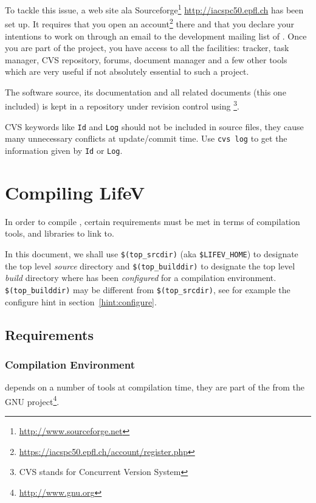 To tackle this issue, a web site ala Sourceforge\footnote{\url{http://www.sourceforge.net}} \url{http://iacspc50.epfl.ch} has been set up. It requires that you open an account\footnote{\url{https://iacspc50.epfl.ch/account/register.php}} there and that you declare your intentions to work on \lifev through an email to the development mailing list of \lifev. Once you are part of the project, you have access to all the facilities: tracker, task manager, CVS repository, forums, document manager and a few other tools which are very useful if not absolutely essential to such a project.


The software source, its documentation and all related documents (this
one included) is kept in a repository under revision control
using \footnote{CVS
  stands for Concurrent Version System}.

CVS keywords like \verb!Id! and \verb!Log! should not be included in source files,
they cause many unnecessary conflicts at update/commit time. Use 
\verb!cvs log! to get the information given by \verb!Id! or \verb!Log!.

\section{Compiling LifeV}
\label{compile-lifev} 

In order to compile \lifev, certain requirements must be met in terms
of compilation tools, and libraries to link to.

\noindent In this document, we shall use \verb+$(top_srcdir)+ (aka \verb+$LIFEV_HOME+) to designate the top level \emph{source} directory 
and \verb+$(top_builddir)+ to designate the top level \emph{build} directory where \lifev has been \emph{configured} for a compilation environment.
\verb+$(top_builddir)+ may be different from  \verb+$(top_srcdir)+, see for example the configure hint in section~\ref{hint:configure}.

\subsection{Requirements}

\subsubsection{Compilation Environment}

\lifev depends on a number of tools at compilation time, they are part
of the  from the GNU
project\footnote{\url{http://www.gnu.org}}. 

